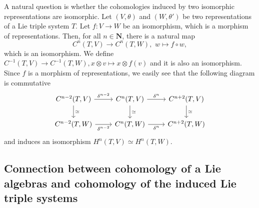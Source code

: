 \documentclass[11pt, twoside]{article}
\begin{document}
A natural question is whether the cohomologies induced by two isomorphic representations are isomorphic. Let $(V,\theta)$ and $(W,\theta')$ be two representations of a Lie triple system $T$. Let $f:V\to W$ be an isomorphism, which is a morphism of representations. Then, for all $n\in \mathbf{N}$, there is a natural map $$C^n(T,V)\to C^n(T,W), \,\, w\mapsto f\circ w ,$$ which is an isomorphism. We define $C^{-1}(T,V)\to C^{-1}(T,W), x\otimes v\mapsto x\otimes f(v) $ and it is also an isomorphism. Since $f$ is a morphism of representations, we easily see that the following diagram is commutative \[\begin{tikzcd}
	{C^{n-2}(T,V)} & {C^n(T,V)} & {C^{n+2}(T,V)} \\
	{C^{n-2}(T,W)} & {C^{n}(T,W)} & {C^{n+2}(T,W)}
	\arrow["{\delta^{n-2}}", from=1-1, to=1-2]
	\arrow["\simeq", from=1-1, to=2-1]
	\arrow["{\delta^n}", from=1-2, to=1-3]
	\arrow["\simeq", from=1-2, to=2-2]
	\arrow["\simeq", from=1-3, to=2-3]
	\arrow["{\delta^{n-2}}"', from=2-1, to=2-2]
	\arrow["{\delta^n}"', from=2-2, to=2-3]
\end{tikzcd}\] and  induces an isomorphism $H^n(T,V)\simeq H^n(T,W) $.

\subsection{Connection between  cohomology of a Lie algebras and  cohomology of the induced Lie triple systems}\label{subs4}
\end{document}
